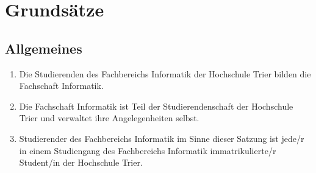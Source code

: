 \section{Grundsätze}

\singlespacing

\subsection{Allgemeines}
\begin{enumerate}
\item Die Studierenden des Fachbereichs Informatik der Hochschule Trier bilden die Fachschaft Informatik.
\item Die Fachschaft Informatik ist Teil der Studierendenschaft der Hochschule Trier und verwaltet ihre Angelegenheiten selbst.
\item Studierender des Fachbereichs Informatik im Sinne dieser Satzung ist jede/r in einem Studiengang des Fachbereichs Informatik immatrikulierte/r Student/in der Hochschule Trier.
\end{enumerate}
